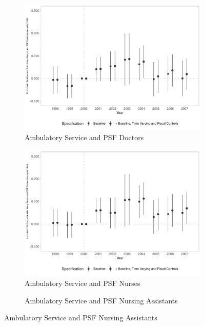 \begin{figure}[h!]
\begin{center}
\begin{subfigure}{0.32\textwidth}
        \centering
        \caption{\scriptsize Ambulatory Service and PSF Doctors}\label{fig:12e}
        \includegraphics[width=\textwidth]{plots/sia_ncnes_medpsf_pcapita_dist_ec29_baseline_dist_ec29_baseline_12.pdf}
    \end{subfigure}
    \begin{subfigure}{0.32\textwidth}
        \centering
        \caption{\scriptsize Ambulatory Service and PSF Nurses}\label{fig:12f}
        \includegraphics[width=\textwidth]{plots/sia_ncnes_enfpsf_pcapita_dist_ec29_baseline_dist_ec29_baseline_12.pdf}
    \end{subfigure}
        \begin{subfigure}{0.32\textwidth}
        \caption{\scriptsize Ambulatory Service and PSF Nursing Assistants}\label{fig:12g}
        \centering

\end{subfigure}
\end{center}
\end{figure}
